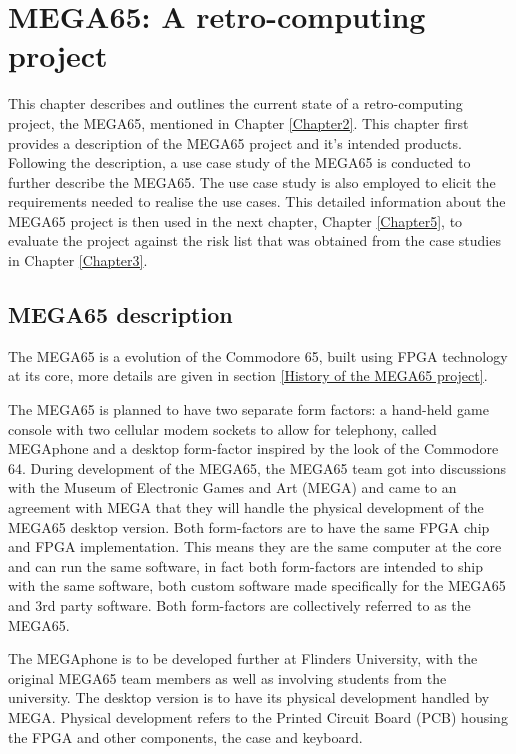 
\chapter{MEGA65: A retro-computing project}
\label{Chapter4}

This chapter describes and outlines the current state of a retro-computing project, the MEGA65, mentioned in Chapter \ref{Chapter2}. This chapter first provides a description of the MEGA65 project and it's intended products. Following the description, a use case study of the MEGA65 is conducted to further describe the MEGA65. The use case study is also employed to elicit the requirements needed to realise the use cases. This detailed information about the MEGA65 project is then used in the next chapter, Chapter \ref{Chapter5}, to evaluate the project against the risk list that was obtained from the case studies in Chapter \ref{Chapter3}.
\section{MEGA65 description}
The MEGA65 is a evolution of the Commodore 65, built using FPGA technology at its core, more details are given in section \ref{History of the MEGA65 project}. 

The MEGA65 is planned to have two separate form factors: a hand-held game console with two cellular modem sockets to allow for telephony, called MEGAphone and a desktop form-factor inspired by the look of the Commodore 64. During development of the MEGA65, the MEGA65 team got into discussions with the Museum of Electronic Games and Art (MEGA) and came to an agreement with MEGA that they will handle the physical development of the MEGA65 desktop version. Both form-factors are to have the same FPGA chip and FPGA implementation. This means they are the same computer at the core and can run the same software, in fact both form-factors are intended to ship with the same software, both custom software made specifically for the MEGA65 and 3rd party software. Both form-factors are collectively referred to as the MEGA65. 

The MEGAphone is to be developed further at Flinders University, with the original MEGA65 team members as well as involving students from the university. The desktop version is to have its physical development handled by MEGA. Physical development refers to the Printed Circuit Board (PCB) housing the FPGA and other components, the case and keyboard. 


